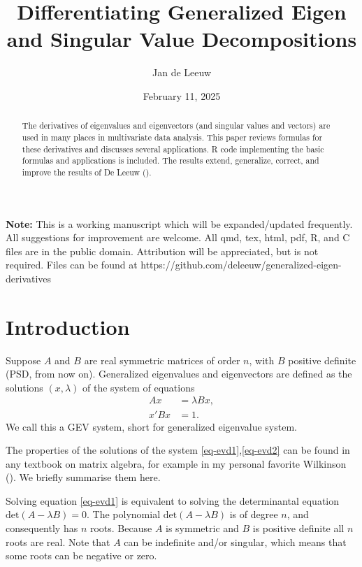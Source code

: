\documentclass[
  12pt,
  letterpaper,
  DIV=11,
  numbers=noendperiod]{scrartcl}
\title{Differentiating Generalized Eigen and Singular Value
Decompositions}
\author{Jan de Leeuw}
\date{February 11, 2025}
\newcommand{\sectionbreak}{\clearpage}
\renewcommand*\contentsname{Table of contents}
\newcommand\contentsname{Table of contents}
\begin{document}
\maketitle
\begin{abstract}
The derivatives of eigenvalues and eigenvectors (and singular values and
vectors) are used in many places in multivariate data analysis. This
paper reviews formulas for these derivatives and discusses several
applications. R code implementing the basic formulas and applications is
included. The results extend, generalize, correct, and improve the
results of De Leeuw ().
\end{abstract}

\renewcommand*\contentsname{Table of contents}
{
\hypersetup{linkcolor=}
\setcounter{tocdepth}{3}
\tableofcontents
}

\sectionbreak

\textbf{Note:} This is a working manuscript which will be
expanded/updated frequently. All suggestions for improvement are
welcome. All qmd, tex, html, pdf, R, and C files are in the public
domain. Attribution will be appreciated, but is not required. Files can
be found at https://github.com/deleeuw/generalized-eigen-derivatives

\sectionbreak

\section{Introduction}\label{sec-intro}

Suppose \(A\) and \(B\) are real symmetric matrices of order \(n\), with
\(B\) positive definite (PSD, from now on). Generalized eigenvalues and
eigenvectors are defined as the solutions \((x,\lambda)\) of the system
of equations \begin{subequations}
\begin{align}
Ax&=\lambda Bx,\label{eq-evd1}\\
x'Bx&=1.\label{eq-evd2}
\end{align}
\end{subequations} We call this a GEV system, short for generalized
eigenvalue system.

The properties of the solutions of the system
\eqref{eq-evd1},\eqref{eq-evd2} can be found in any textbook on matrix
algebra, for example in my personal favorite Wilkinson
(). We briefly summarise them here.

Solving equation \eqref{eq-evd1} is equivalent to solving the
determinantal equation \(\text{det}(A-\lambda B)=0\). The polynomial
\(\text{det}(A-\lambda B)\) is of degree \(n\), and consequently has
\(n\) roots. Because \(A\) is symmetric and \(B\) is positive definite
all \(n\) roots are real. Note that \(A\) can be indefinite and/or
singular, which means that some roots can be negative or zero.
\end{document}
